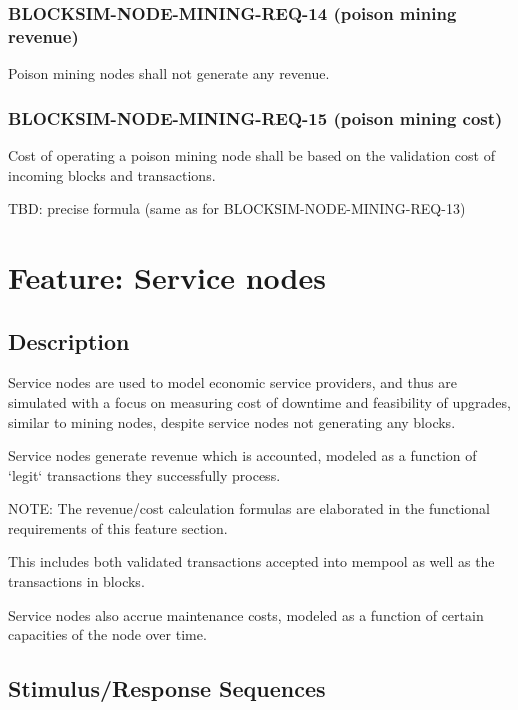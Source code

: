 \documentclass{scrreprt}
\begin{document}
      \subsubsection{BLOCKSIM-NODE-MINING-REQ-14 (poison mining revenue)}

        Poison mining nodes shall not generate any revenue.

      \subsubsection{BLOCKSIM-NODE-MINING-REQ-15 (poison mining cost)}

        Cost of operating a poison mining node shall be based on the validation
        cost of incoming blocks and transactions.

        TBD: precise formula (same as for BLOCKSIM-NODE-MINING-REQ-13)

  \section{Feature: Service nodes}

    \subsection{Description}

      Service nodes are used to model economic service providers, and thus
      are simulated with a focus on measuring cost of downtime and feasibility
      of upgrades, similar to mining nodes, despite service nodes not
      generating
      any blocks.

      Service nodes generate revenue which is accounted, modeled as a function
      of `legit` transactions they successfully process.

      NOTE: The revenue/cost calculation formulas are elaborated in the
      functional requirements of this feature section.

      This includes both validated transactions accepted into mempool as well
      as the transactions in blocks.

      Service nodes also accrue maintenance costs, modeled as a function of
      certain capacities of the node over time.

    \subsection{Stimulus/Response Sequences}
\end{document}

